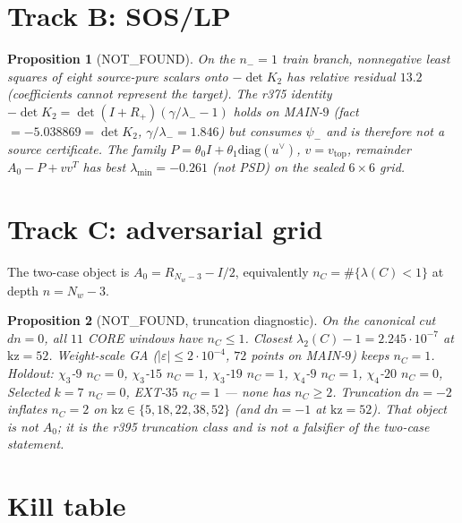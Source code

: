 \documentclass[11pt]{article}
\newtheorem{prop}{Proposition}
\theoremstyle{remark}
\newcommand{\Cmat}{C}
\begin{document}
\section{Track B: SOS/LP}

\begin{prop}[NOT\_FOUND]\label{prop:b}
On the $n_-=1$ train branch, nonnegative least squares of
eight source-pure scalars onto $-\det K_2$ has relative
residual $13.2$ (coefficients cannot represent the
target).
The r375 identity $-\det K_2=\det(I+R_+)(\gamma/\lambda_--1)$
holds on MAIN-$9$ (fact $=-5.038869=\det K_2$,
$\gamma/\lambda_-=1.846$) but consumes $\psi_-$ and is
therefore not a source certificate.
The family $P=\theta_0 I+\theta_1\mathrm{diag}(u^\vee)$,
$v=v_{\mathrm{top}}$, remainder $A_0-P+vv^T$ has best
$\lambda_{\min}=-0.261$ (not PSD) on the sealed $6\times 6$
grid.
\end{prop}

\section{Track C: adversarial grid}

The two-case object is $A_0=R_{N_w-3}-I/2$, equivalently
$n_C=\#\{\lambda(\Cmat)<1\}$ at depth $n=N_w-3$.

\begin{prop}[NOT\_FOUND, truncation diagnostic]\label{prop:c}
On the canonical cut $dn=0$, all $11$ CORE windows have
$n_C\le 1$.
Closest $\lambda_2(C)-1=2.245\cdot 10^{-7}$ at
$\mathrm{kz}=52$.
Weight-scale GA ($|\varepsilon|\le 2\cdot 10^{-4}$, $72$
points on MAIN-$9$) keeps $n_C=1$.
Holdout: $\chi_3$-$9$ $n_C=0$, $\chi_3$-$15$ $n_C=1$,
$\chi_3$-$19$ $n_C=1$, $\chi_4$-$9$ $n_C=1$,
$\chi_4$-$20$ $n_C=0$, Selected $k=7$ $n_C=0$,
EXT-$35$ $n_C=1$ --- none has $n_C\ge 2$.
Truncation $dn=-2$ inflates $n_C=2$ on
$\mathrm{kz}\in\{5,18,22,38,52\}$ (and $dn=-1$ at
$\mathrm{kz}=52$).
That object is \emph{not} $A_0$; it is the r395
truncation class and is not a falsifier of the
two-case statement.
\end{prop}

\section{Kill table}
\end{document}
